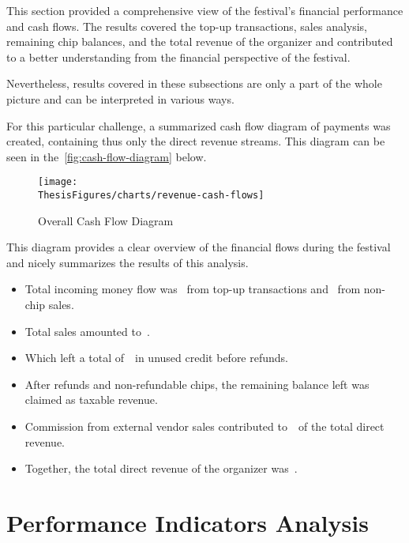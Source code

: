 This section provided a comprehensive view of the festival's financial performance and cash flows.
The results covered the top-up transactions, sales analysis, remaining chip balances, and the total revenue of the organizer and contributed to a better understanding from the financial perspective of the festival.

Nevertheless, results covered in these subsections are only a part of the whole picture and can be interpreted in various ways.

For this particular challenge, a summarized cash flow diagram of payments was created, containing thus only the direct revenue streams.
This diagram can be seen in the~\autoref{fig:cash-flow-diagram} below.

\begin{figure}[H]
	\centering
	\texttt{[image: \\ThesisFigures/charts/revenue-cash-flows]}
	\caption{Overall Cash Flow Diagram}
	\label{fig:cash-flow-diagram}
	\source
\end{figure}

This diagram provides a clear overview of the financial flows during the festival and nicely summarizes the results of this analysis.

\begin{keytakeaways}
	\begin{itemize}
		\item Total incoming money flow was~ from top-up transactions and~ from non-chip sales.
		\item Total sales amounted to~.
		\item Which left a total of~~in unused credit before refunds.
		\item After refunds and non-refundable chips, the remaining balance left was~ claimed as taxable revenue.
		\item Commission from external vendor sales contributed to~~of the total direct revenue.
		\item Together, the total direct revenue of the organizer was~.
	\end{itemize}
\end{keytakeaways}



\section{Performance Indicators Analysis}
\label{sec:analysis-performance-indicators}

